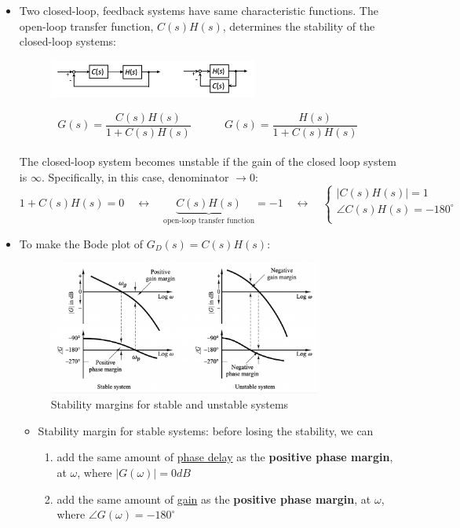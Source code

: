 \documentclass[12pt,a4paper]{article}
\begin{document}
\begin{itemize}
\item Two closed-loop, feedback systems have same characteristic functions. The open-loop transfer function, $C(s)H(s)$, determines the stability of the closed-loop systems:
\begin{figure}[H] \centering
\includegraphics[width=0.65\textwidth]{images/closed_loop_stability.png}
\end{figure} \vspace{-1cm}
\[G(s) = \frac{C(s)H(s)}{1+C(s)H(s)} \quad \quad \quad G(s) =\frac{H(s)}{1+C(s)H(s)} \]\\
The closed-loop system becomes unstable if the gain of the closed loop system is $\infty$. Specifically, in this case, denominator $\to 0$:
\[1+C(s)H(s) =0 \quad \leftrightarrow  \quad \underbrace{C(s)H(s)}_{\text{open-loop transfer function}}=-1 \quad \leftrightarrow \quad \begin{cases}
\lvert C(s)H(s) \rvert =1 \\
\angle C(s)H(s) =-180^{\circ}\\
\end{cases} \]
\item To make the Bode plot of $G_{D}(s) = C(s)H(s)$:
\begin{figure}[H] \centering
\includegraphics[width=0.85\textwidth]{images/margin.pdf}
\caption{Stability margins for stable and unstable systems}
\end{figure}
\begin{itemize}
\item Stability margin for stable systems: before losing the stability, we can 
\begin{enumerate}
\item add the same amount of \underline{phase delay} as the \textbf{positive phase margin}, at $\omega$, where $\lvert G(\omega)\rvert=0dB$
\item add the same amount of \underline{gain} as the \textbf{positive phase margin}, at $\omega$, where $\angle G(\omega)=-180^{\circ}$
\end{enumerate}


\end{itemize}
\end{itemize}
\end{document}
